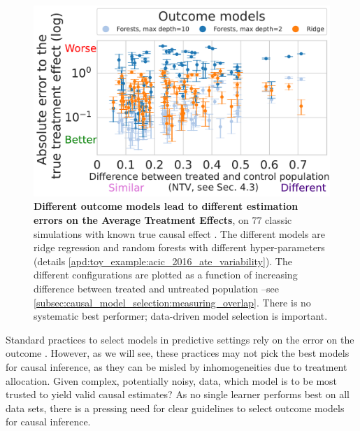 \documentclass[french,12pt,twoside,a4paper]{book}
\begin{document}
\begin{figure}[h!]
  \begin{minipage}{.3\linewidth}
    \caption{\textbf{Different outcome models lead to different
        estimation errors on the Average Treatment Effects},
      on 77 classic simulations with known true causal effect
      \citep{dorie_automated_2019}. The different models are ridge regression
      and random forests with different hyper-parameters
      (details
      \ref{apd:toy_example:acic_2016_ate_variability}). The different configurations are
      plotted as a function of increasing difference between treated and
      untreated population --see
      \autoref{subsec:causal_model_selection:measuring_overlap}.
      There is no systematic best performer; data-driven model
      selection is important.
      \label{fig:acic_2016_ate_heterogeneity}
    }
  \end{minipage}
  \hfill
  \begin{minipage}{.65\linewidth}
    \includegraphics[width=\linewidth]{img/chapter_5/_2023-03-08-11-10-28_acic_2016_ate_heterogeneity.parquet_abs_bias_ylog_scale=True.pdf}%
  \end{minipage}
\end{figure}

Standard practices to select models in predictive settings rely on
the error on the outcome
\citep{poldrack2020establishment,varoquaux2022evaluating}. However, as we
will see, these practices may not pick the best models
for causal inference, as they can be misled by inhomogeneities due to
treatment allocation.
%
Given complex, potentially noisy, data, which model is to be most trusted to
yield valid causal estimates? As no single learner performs
best on all data sets, there is a pressing need for clear guidelines to select
outcome models for causal inference.
\end{document}
